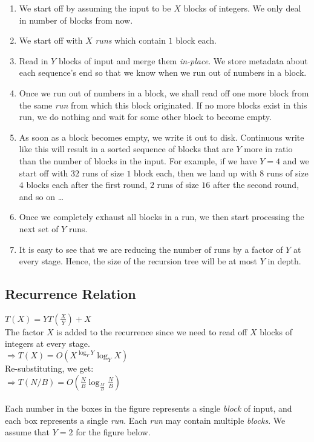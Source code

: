 \documentclass{article}
\begin{document}
\begin{enumerate}
\item We start off by assuming the input to be $X$ blocks of
  integers. We only deal in number of blocks from now.
\item We start off with $X$ \textit{runs} which contain $1$ block
  each.
\item Read in $Y$ blocks of input and merge them
  \textit{in-place}. We store metadata about each sequence's end so
  that we know when we run out of numbers in a block.
\item Once we run out of numbers in a block, we shall read off one more
  block from the same \textit{run} from which this block
  originated. If no more blocks exist in this run, we do nothing and
  wait for some other block to become empty.
\item As soon as a block becomes empty, we write it out to
  disk. Continuous write like this will result in a sorted sequence of
  blocks that are $Y$ more in ratio than the number of blocks in the
  input. For example, if we have $Y = 4$ and we start off with $32$
  runs of size $1$ block each, then we land up with $8$ runs of size
  $4$ blocks each after the first round, $2$ runs of size $16$ after
  the second round, and so on \ldots{}
\item Once we completely exhaust all blocks in a run, we then start
  processing the next set of $Y$ runs.
\item It is easy to see that we are reducing the number of runs by a
  factor of $Y$ at every stage. Hence, the size of the recursion tree
  will be at most $Y$ in depth.
\end{enumerate}

\subsection{Recurrence Relation}

$T(X) = YT(\frac{X}{Y}) + X$\\
The factor $X$ is added to the recurrence since we need to read off
$X$ blocks of integers at every stage.\\
$\Rightarrow T(X) = O(X^{\log_Y{Y}}\log_Y{X})$\\
Re-substituting, we get:\\
$\Rightarrow T(N/B) = O(\frac{N}{B}\log_{\frac{M}{B}}{\frac{N}{B}})$\\
\\
Each number in the boxes in the figure represents a single
\textit{block} of input, and each box represents a single
\textit{run}. Each \textit{run} may contain multiple
\textit{blocks}. We assume that $Y = 2$ for the figure below.
\end{document}
